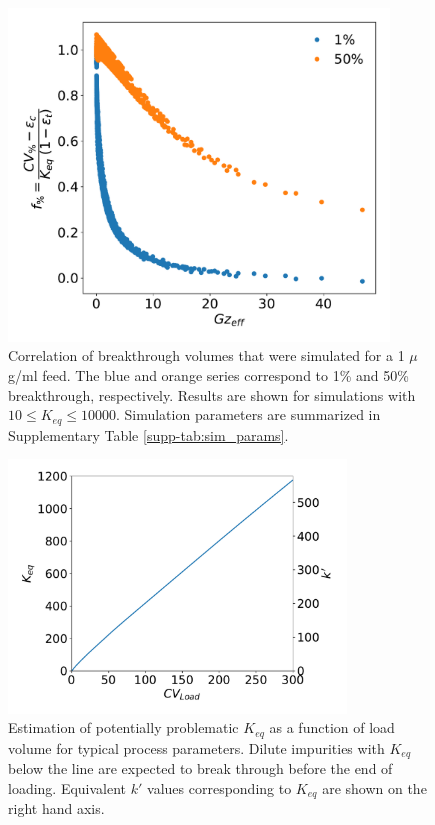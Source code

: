 \documentclass[11pt,a4paper]{article}
\providecommand{\DIFaddtex}[1]{{\protect\color{blue} \sf #1}} %
\providecommand{\DIFaddFL}[1]{\DIFadd{#1}} %
\providecommand{\DIFaddbeginFL}{} %
\providecommand{\DIFaddendFL}{} %
\providecommand{\DIFdelbeginFL}{} %
\providecommand{\DIFdelendFL}{} %
\providecommand{\DIFadd}[1]{\texorpdfstring{\DIFaddtex{#1}}{#1}} %
\begin{document}
\begin{figure}[bp]
    \centering
    \DIFdelbeginFL %
\DIFdelendFL \DIFaddbeginFL \includegraphics[width=0.9\textwidth]{figure_3}
    \DIFaddendFL \caption{Correlation of breakthrough volumes that were simulated for a 1 $\mu$g/ml feed. The blue and orange series correspond to 1\% and 50\% breakthrough, respectively. Results are shown for simulations with $10 \leq K_{eq} \leq 10000$. \DIFaddbeginFL \DIFaddFL{Simulation parameters are summarized in Supplementary Table }\protect\DIFaddFL{\ref{supp-tab:sim_params}.}\DIFaddendFL }
    \label{fig:correlation of breakthrough volumes}
\end{figure}


\begin{figure}[bp]
    \centering
    \DIFdelbeginFL %
\DIFdelendFL \DIFaddbeginFL \includegraphics[width=0.8\textwidth]{figure_4}
    \DIFaddendFL \caption{Estimation of \DIFaddbeginFL \DIFaddFL{potentially }\DIFaddendFL problematic $K_{eq}$ as a function of load volume for typical process parameters. Dilute impurities with $K_{eq}$ below the line are expected to break through before the end of loading. Equivalent $k'$ values corresponding to $K_{eq}$ are shown on the right hand axis.}
    \label{fig:problematic Keq}
\end{figure}
\end{document}
